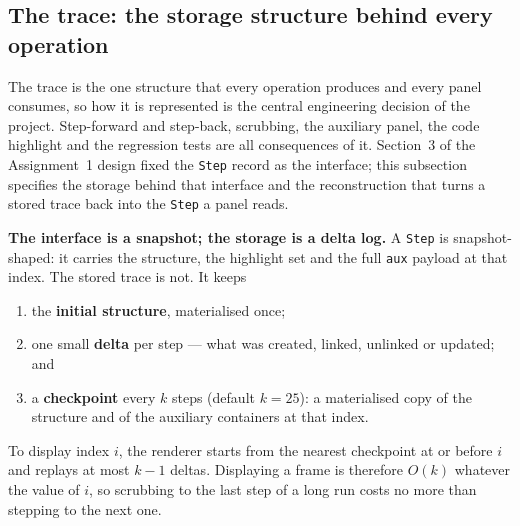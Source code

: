 \documentclass[11pt,a4paper]{article}
\newcommand{\ct}[1]{\texttt{#1}}
\begin{document}
\subsection{The trace: the storage structure behind every operation}
\label{sec:trace}

The trace is the one structure that every operation produces and every panel consumes, so how it
is represented is the central engineering decision of the project. Step-forward and step-back,
scrubbing, the auxiliary panel, the code highlight and the regression tests are all consequences of
it. Section~3 of the Assignment~1 design fixed the \ct{Step} record as the interface; this
subsection specifies the storage behind that interface and the reconstruction that turns a stored
trace back into the \ct{Step} a panel reads.

\smallskip
\noindent\textbf{The interface is a snapshot; the storage is a delta log.} A \ct{Step} is
snapshot-shaped: it carries the structure, the highlight set and the full \ct{aux} payload at that
index. The stored trace is not. It keeps

\begin{enumerate}[leftmargin=1.6em,topsep=2pt,itemsep=1pt]
  \item the \textbf{initial structure}, materialised once;
  \item one small \textbf{delta} per step --- what was created, linked, unlinked or updated; and
  \item a \textbf{checkpoint} every $k$ steps (default $k=25$): a materialised copy of the
        structure and of the auxiliary containers at that index.
\end{enumerate}

\noindent To display index $i$, the renderer starts from the nearest checkpoint at or before $i$
and replays at most $k-1$ deltas. Displaying a frame is therefore $O(k)$ whatever the value of
$i$, so scrubbing to the last step of a long run costs no more than stepping to the next one.
\end{document}
